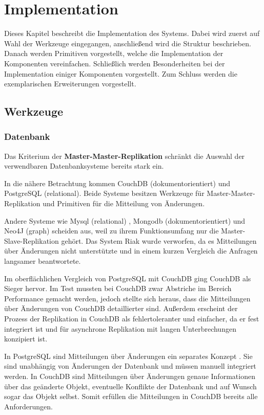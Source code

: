 \chapter{Implementation}
\label{cha:imp}

Dieses Kapitel beschreibt die Implementation des Systems.
Dabei wird zuerst auf Wahl der Werkzeuge eingegangen,
anschließend wird die Struktur beschrieben.
Danach werden Primitiven vorgestellt, welche die Implementation der Komponenten vereinfachen.
Schließlich werden Besonderheiten bei der Implementation einiger Komponenten vorgestellt.
Zum Schluss werden die exemplarischen Erweiterungen vorgestellt.

\section{Werkzeuge}
\label{sec:imp:tools}
\subsection{Datenbank}

Das Kriterium der \textbf{Master-Master-Replikation}
schränkt die Auswahl der verwendbaren Datenbanksysteme bereits stark ein.

In die nähere Betrachtung kommen CouchDB \cite{couchdb:website} (dokumentorientiert)
und PostgreSQL \cite{postgresql:website} (relational).
Beide Systeme besitzen Werkzeuge für Master-Master-Replikation
und Primitiven für die Mitteilung von Änderungen.

Andere Systeme wie Mysql (relational) \cite{mysql:website}, Mongodb (dokumentorientiert) \cite{mongodb:website}
und  Neo4J (graph) \cite{neo4j:website} scheiden aus, weil zu ihrem Funktionsumfang
nur die Master-Slave-Replikation geh\"ort.
Das System Riak \cite{riak:website} wurde verworfen, da es Mitteilungen über Änderungen nicht unterstützte und in einem kurzen Vergleich
die Anfragen langsamer beantwortete.

Im oberflächlichen Vergleich von PostgreSQL mit CouchDB ging CouchDB als Sieger hervor.
Im Test mussten bei CouchDB zwar Abstriche im Bereich Performance gemacht werden,
jedoch stellte sich heraus, dass die Mitteilungen über Änderungen von CouchDB detaillierter sind.
Außerdem erscheint der Prozess der Replikation in CouchDB als fehlertoleranter und einfacher, da er fest integriert ist und für asynchrone Replikation mit langen Unterbrechungen konzipiert ist.

In PostgreSQL sind Mitteilungen über Änderungen ein separates Konzept \cite{postgresql:notify}.
Sie sind unabhängig von Änderungen der Datenbank und müssen manuell integriert werden. 
In CouchDB sind Mitteilungen \cite[Chap Notifications]{couchdb:guide} über Änderungen genaue Informationen
über das geänderte Objekt, eventuelle Konflikte der Datenbank
und auf Wunsch sogar das Objekt selbst. Somit erfüllen die Mitteilungen in CouchDB bereits alle Anforderungen.

